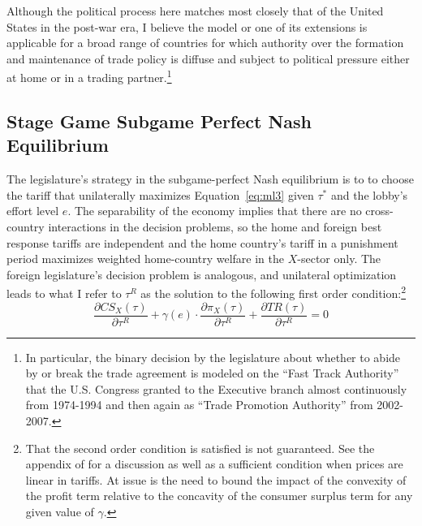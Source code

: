 \documentclass[authoryear, review]{elsarticle}
\newcommand{\ga}{\gamma}
\begin{document}
Although the political process here matches most closely that of the United States in the post-war era, I believe the model or one of its extensions is applicable for a broad range of countries for which authority over the formation and maintenance of trade policy is diffuse and subject to political pressure either at home or in a trading partner.\footnote{In particular, the binary decision by the legislature about whether to abide by or break the trade agreement is modeled on the ``Fast Track Authority'' that the U.S. Congress granted to the Executive branch almost continuously from 1974-1994 and then again as ``Trade Promotion Authority'' from 2002-2007.} 

\subsection{Stage Game Subgame Perfect Nash Equilibrium}
\label{sec:stagespne}
The legislature's strategy in the subgame-perfect Nash equilibrium is to to choose the tariff that unilaterally maximizes Equation~\ref{eq:ml3} given $\tau^*$ and the lobby's effort level $e$. The separability of the economy implies that there are no cross-country interactions in the decision problems, so the home and foreign best response tariffs are independent and the home country's tariff in a punishment period maximizes weighted home-country welfare in the $X$-sector only. The foreign legislature's decision problem is analogous, and unilateral optimization leads to what I refer to $\tau^R$ as the solution to the following first order condition:\footnote{That the second order condition is satisfied is not guaranteed. See the appendix of \citet{buzard2013b} for a discussion as well as a sufficient condition when prices are linear in tariffs. At issue is the need to bound the impact of the convexity of the profit term relative to the concavity of the consumer surplus term for any given value of $\ga$.\label{fn:legsoc}}
\begin{equation}
		\frac{\partial \mathit{CS}_X(\tau)}{\partial \tau^R} + \ga(e) \cdot \frac{\partial \pi_X(\tau)}{\partial \tau^R} +  \frac{\partial \mathit{TR}(\tau)}{\partial \tau^R} = 0
		\label{eq:leguni}
\end{equation}
\end{document}
